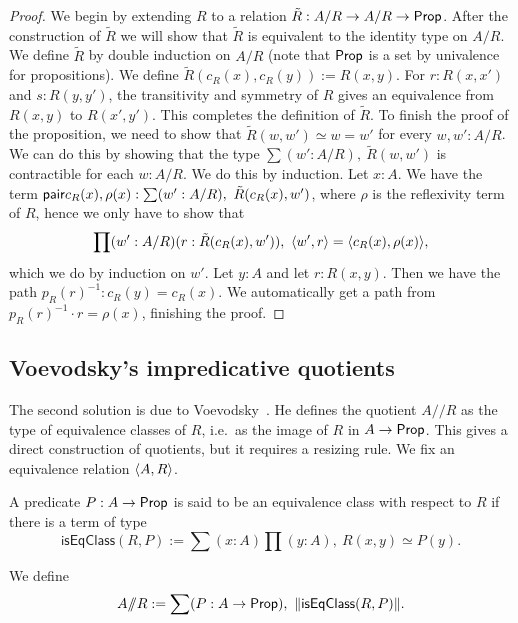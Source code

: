 \begin{proof}
We begin by extending $R$ to a relation $\tilde{R}:A/R\to A/R\to\mathsf{Prop}$. After
the construction of $\tilde{R}$ we will show that $\tilde{R}$ is equivalent
to the identity type on $A/R$. We define $\tilde{R}$ by double induction on
$A/R$ (note that $\mathsf{Prop}$ is a set by univalence for propositions). We
define $\tilde{R}(c_R(x),c_R(y)) := R(x,y)$. For $r:R(x,x')$ and $s:R(y,y')$,
the transitivity and symmetry 
of $R$ gives an equivalence from $R(x,y)$ to $R(x',y')$. This completes the
definition of $\tilde{R}$. To finish the proof of the proposition, we need
to show that $\tilde{R}(w,w')\simeq w= w'$ for every $w,w':A/R$. We can
do this by showing that the type $\sum(w':A/R),\ \tilde{R}(w,w')$ is contractible for
each $w:A/R$. We do this by induction. Let $x:A$. We have the term 
$\pair{c_R(x),\rho(x)}:\sum(w':A/R),\ \tilde{R}(c_R(x),w')$, where $\rho$ is
the reflexivity term of $R$, hence we only
have to show that
\begin{equation*}
\prod(w':A/R)(r:\tilde{R}(c_R(x),w')),\ \pairr{w',r}=\pairr{c_R(x),\rho(x)},
\end{equation*}
which we do by induction on $w'$. Let $y:A$ and let $r:R(x,y)$. Then we have
the path $p_R(r)^{-1}:c_R(y)= c_R(x)$. We automatically get a path from
$p_R(r)^{-1}\cdot r=\rho(x)$, finishing the proof.
\end{proof}

\subsection{Voevodsky's impredicative quotients}\label{sec:resizing}
The second solution is due to Voevodsky~\cite{pelayo2013preliminary}.
He defines the quotient $A/\!\!/R $ as the type of equivalence classes of $R$, 
i.e.\ as the image of $R$ in $A\to\mathsf{Prop}$. This gives a direct
construction of quotients, but it requires a resizing rule. We fix an equivalence relation ${\langle A,R\rangle}$.

\begin{defn}
A predicate $P:A\to\mathsf{Prop}$ is said to be an equivalence class with 
respect to $R $ if there is a term of type
\begin{equation*}
\mathsf{isEqClass}(R ,P):=\sum(x:A)\prod(y:A),\ R (x,y)\simeq P(y).
\end{equation*}
\end{defn}

\begin{defn}\label{def:VVquotient}
We define
\begin{equation*}
A/\!\!/ R :=\sum(P:A\to\prop),\ \|\mathsf{isEqClass}(R ,P)\|.
\end{equation*}
\end{defn}

